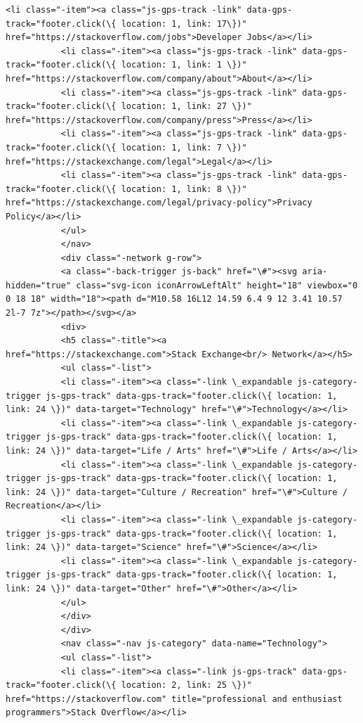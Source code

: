 \documentclass[11pt]{article}
\begin{document}
\begin{Verbatim}[commandchars=\\\{\}]
           <li class="-item"><a class="js-gps-track -link" data-gps-track="footer.click(\{ location: 1, link: 17\})" href="https://stackoverflow.com/jobs">Developer Jobs</a></li>
           <li class="-item"><a class="js-gps-track -link" data-gps-track="footer.click(\{ location: 1, link: 1 \})" href="https://stackoverflow.com/company/about">About</a></li>
           <li class="-item"><a class="js-gps-track -link" data-gps-track="footer.click(\{ location: 1, link: 27 \})" href="https://stackoverflow.com/company/press">Press</a></li>
           <li class="-item"><a class="js-gps-track -link" data-gps-track="footer.click(\{ location: 1, link: 7 \})" href="https://stackexchange.com/legal">Legal</a></li>
           <li class="-item"><a class="js-gps-track -link" data-gps-track="footer.click(\{ location: 1, link: 8 \})" href="https://stackexchange.com/legal/privacy-policy">Privacy Policy</a></li>
           </ul>
           </nav>
           <div class="-network g-row">
           <a class="-back-trigger js-back" href="\#"><svg aria-hidden="true" class="svg-icon iconArrowLeftAlt" height="18" viewbox="0 0 18 18" width="18"><path d="M10.58 16L12 14.59 6.4 9 12 3.41 10.57 2l-7 7z"></path></svg></a>
           <div>
           <h5 class="-title"><a href="https://stackexchange.com">Stack Exchange<br/> Network</a></h5>
           <ul class="-list">
           <li class="-item"><a class="-link \_expandable js-category-trigger js-gps-track" data-gps-track="footer.click(\{ location: 1, link: 24 \})" data-target="Technology" href="\#">Technology</a></li>
           <li class="-item"><a class="-link \_expandable js-category-trigger js-gps-track" data-gps-track="footer.click(\{ location: 1, link: 24 \})" data-target="Life / Arts" href="\#">Life / Arts</a></li>
           <li class="-item"><a class="-link \_expandable js-category-trigger js-gps-track" data-gps-track="footer.click(\{ location: 1, link: 24 \})" data-target="Culture / Recreation" href="\#">Culture / Recreation</a></li>
           <li class="-item"><a class="-link \_expandable js-category-trigger js-gps-track" data-gps-track="footer.click(\{ location: 1, link: 24 \})" data-target="Science" href="\#">Science</a></li>
           <li class="-item"><a class="-link \_expandable js-category-trigger js-gps-track" data-gps-track="footer.click(\{ location: 1, link: 24 \})" data-target="Other" href="\#">Other</a></li>
           </ul>
           </div>
           </div>
           <nav class="-nav js-category" data-name="Technology">
           <ul class="-list">
           <li class="-item"><a class="-link js-gps-track" data-gps-track="footer.click(\{ location: 2, link: 25 \})" href="https://stackoverflow.com" title="professional and enthusiast programmers">Stack Overflow</a></li>

\end{Verbatim}
\end{document}
